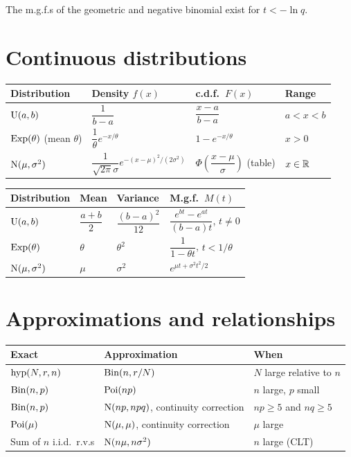 The m.g.f.s of the geometric and negative binomial exist for $t < -\ln q$.

\section{Continuous distributions}

\begin{center}
\renewcommand{\arraystretch}{1.6}
\begin{tabular}{llll}
\toprule
Distribution & Density $f(x)$ & c.d.f.\ $F(x)$ & Range \\
\midrule
$\operatorname{U}(a,b)$ & $\dfrac{1}{b-a}$ & $\dfrac{x-a}{b-a}$ & $a < x < b$ \\
$\operatorname{Exp}(\theta)$ (mean $\theta$) & $\dfrac1\theta e^{-x/\theta}$ & $1-e^{-x/\theta}$ & $x > 0$ \\
$\operatorname{N}(\mu,\sigma^2)$ & $\dfrac{1}{\sqrt{2\pi}\sigma}e^{-(x-\mu)^2/(2\sigma^2)}$ & $\Phi\left(\dfrac{x-\mu}{\sigma}\right)$ (table) & $x\in\mathbb{R}$ \\
\bottomrule
\end{tabular}
\end{center}

\begin{center}
\renewcommand{\arraystretch}{1.6}
\begin{tabular}{llll}
\toprule
Distribution & Mean & Variance & M.g.f.\ $M(t)$ \\
\midrule
$\operatorname{U}(a,b)$ & $\dfrac{a+b}{2}$ & $\dfrac{(b-a)^2}{12}$ & $\dfrac{e^{bt}-e^{at}}{(b-a)t}$, $t\ne0$ \\
$\operatorname{Exp}(\theta)$ & $\theta$ & $\theta^2$ & $\dfrac{1}{1-\theta t}$, $t < 1/\theta$ \\
$\operatorname{N}(\mu,\sigma^2)$ & $\mu$ & $\sigma^2$ & $e^{\mu t+\sigma^2t^2/2}$ \\
\bottomrule
\end{tabular}
\end{center}

\section{Approximations and relationships}

\begin{center}
\begin{tabular}{lll}
\toprule
Exact & Approximation & When \\
\midrule
$\operatorname{hyp}(N,r,n)$ & $\operatorname{Bin}(n, r/N)$ & $N$ large relative to $n$ \\
$\operatorname{Bin}(n,p)$ & $\operatorname{Poi}(np)$ & $n$ large, $p$ small \\
$\operatorname{Bin}(n,p)$ & $\operatorname{N}(np, npq)$, continuity correction & $np\ge5$ and $nq\ge5$ \\
$\operatorname{Poi}(\mu)$ & $\operatorname{N}(\mu,\mu)$, continuity correction & $\mu$ large \\
Sum of $n$ i.i.d.\ r.v.s & $\operatorname{N}(n\mu, n\sigma^2)$ & $n$ large (CLT) \\
\bottomrule
\end{tabular}
\end{center}

